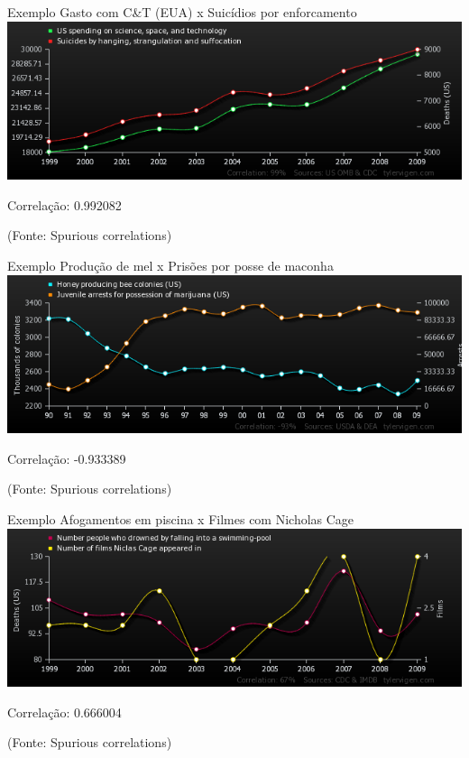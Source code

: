 \documentclass{beamer}
\begin{document}

\begin{frame}{Exemplo}
  Gasto com C\&T (EUA) x Suicídios por enforcamento
  \includegraphics[width=\textwidth]{us-spending-on-science-space-and-technology_suicides-by-hanging-strangulation-and-suffocation}

  Correlação: 0.992082

  (Fonte: Spurious correlations)
\end{frame}

\begin{frame}{Exemplo}
  Produção de mel x Prisões por posse de maconha
  \includegraphics[width=\textwidth]{honey-producing-bee-colonies-us_juvenile-arrests-for-possession-of-marijuana-us}

  Correlação: -0.933389

  (Fonte: Spurious correlations)
\end{frame}

\begin{frame}{Exemplo}
  Afogamentos em piscina x Filmes com Nicholas Cage
  \includegraphics[width=\textwidth]{number-people-who-drowned-by-falling-into-a-swimming-pool_number-of-films-niclas-cage-appeared-in}

  Correlação: 0.666004

  (Fonte: Spurious correlations)
\end{frame}
\end{document}
